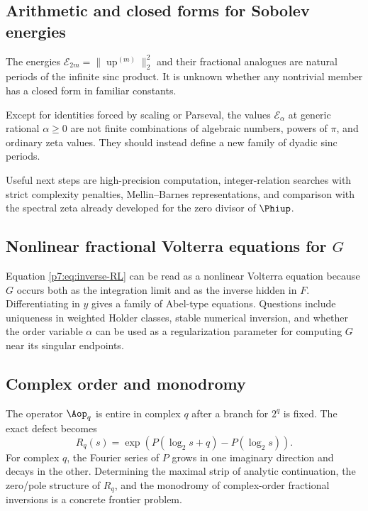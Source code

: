 \documentclass[11pt,oneside]{article}
\theoremstyle{definition}
\theoremstyle{remark}
\newcommand{\Up}{\operatorname{up}}
\newcommand{\1}{\mathbf 1}
\begin{document}
\subsection{Arithmetic and closed forms for Sobolev energies}

The energies $\mathcal E_{2m}=\|\Up^{(m)}\|_2^2$ and their fractional analogues are natural
periods of the infinite sinc product.  It is unknown whether any nontrivial member has a
closed form in familiar constants.

\begin{conjecture}
Except for identities forced by scaling or Parseval, the values $\mathcal E_\alpha$ at generic
rational $\alpha\ge0$ are not finite combinations of algebraic numbers, powers of $\pi$, and
ordinary zeta values.  They should instead define a new family of dyadic sinc periods.
\statusopen
\end{conjecture}

Useful next steps are high-precision computation, integer-relation searches with strict
complexity penalties, Mellin--Barnes representations, and comparison with the spectral zeta
already developed for the zero divisor of $\Phiup$.

\subsection{Nonlinear fractional Volterra equations for $G$}

Equation \cref{p7:eq:inverse-RL} can be read as a nonlinear Volterra equation because $G$ occurs
both as the integration limit and as the inverse hidden in $F$.  Differentiating in $y$ gives a
family of Abel-type equations.  Questions include uniqueness in weighted Holder classes,
stable numerical inversion, and whether the order variable $\alpha$ can be used as a
regularization parameter for computing $G$ near its singular endpoints.

\subsection{Complex order and monodromy}

The operator $\Aop_q$ is entire in complex $q$ after a branch for $2^q$ is fixed.  The exact
defect becomes
\[
 R_q(s)=\exp(P(\log_2s+q)-P(\log_2s)).
\]
For complex $q$, the Fourier series of $P$ grows in one imaginary direction and decays in the
other.  Determining the maximal strip of analytic continuation, the zero/pole structure of
$R_q$, and the monodromy of complex-order fractional inversions is a concrete frontier
problem.
\end{document}
